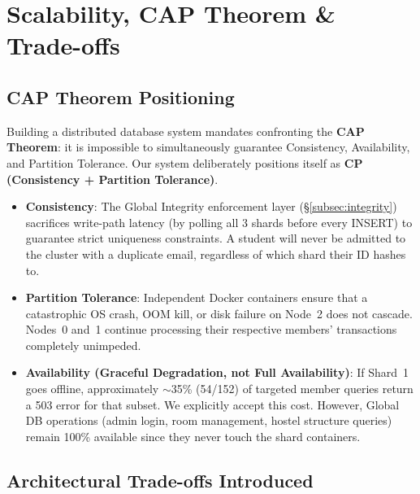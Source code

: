 \documentclass[sigconf]{acmart}
\begin{document}
\section{Scalability, CAP Theorem \& Trade-offs}

\subsection{CAP Theorem Positioning}

Building a distributed database system mandates confronting the \textbf{CAP Theorem}: it is impossible to simultaneously guarantee Consistency, Availability, and Partition Tolerance. Our system deliberately positions itself as \textbf{CP (Consistency + Partition Tolerance)}.

\begin{itemize}[leftmargin=*]
    \item \textbf{Consistency}: The Global Integrity enforcement layer (\S\ref{subsec:integrity}) sacrifices write-path latency (by polling all 3 shards before every INSERT) to guarantee strict uniqueness constraints. A student will never be admitted to the cluster with a duplicate email, regardless of which shard their ID hashes to.
    \item \textbf{Partition Tolerance}: Independent Docker containers ensure that a catastrophic OS crash, OOM kill, or disk failure on Node~2 does not cascade. Nodes~0 and~1 continue processing their respective members' transactions completely unimpeded.
    \item \textbf{Availability (Graceful Degradation, not Full Availability)}: If Shard~1 goes offline, approximately $\sim$35\% (54/152) of targeted member queries return a 503 error for that subset. We explicitly accept this cost. However, Global DB operations (admin login, room management, hostel structure queries) remain 100\% available since they never touch the shard containers.
\end{itemize}

\subsection{Architectural Trade-offs Introduced}
\end{document}
